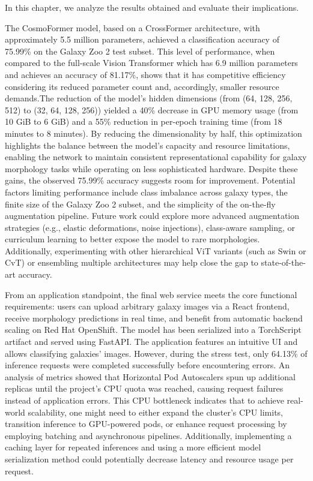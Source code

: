 In this chapter, we analyze the results obtained and evaluate their implications.

The CosmoFormer model, based on a CrossFormer architecture, with approximately 5.5 million parameters, achieved a classification accuracy of 75.99\% on the Galaxy Zoo 2 test subset. This level of performance, when compared to the full-scale Vision Transformer which has 6.9 million parameters and achieves an accuracy of 81.17\%, shows that it has competitive efficiency considering its reduced parameter count and, accordingly, smaller resource demands.The reduction of the model’s hidden dimensions (from (64, 128, 256, 512) to (32, 64, 128, 256)) yielded a 40\% decrease in GPU memory usage (from 10 GiB to 6 GiB) and a 55\% reduction in per-epoch training time (from 18 minutes to 8 minutes). By reducing the dimensionality by half, this optimization highlights the balance between the model’s capacity and resource limitations, enabling the network to maintain consistent representational capability for galaxy morphology tasks while operating on less sophisticated hardware. Despite these gains, the observed 75.99\% accuracy suggests room for improvement. Potential factors limiting performance include class imbalance across galaxy types, the finite size of the Galaxy Zoo 2 subset, and the simplicity of the on-the-fly augmentation pipeline. Future work could explore more advanced augmentation strategies (e.g., elastic deformations, noise injections), class-aware sampling, or curriculum learning to better expose the model to rare morphologies. Additionally, experimenting with other hierarchical ViT variants (such as Swin or CvT) or ensembling multiple architectures may help close the gap to state-of-the-art accuracy.

From an application standpoint, the final web service meets the core functional requirements: users can upload arbitrary galaxy images via a React frontend, receive morphology predictions in real time, and benefit from automatic backend scaling on Red Hat OpenShift. The model has been serialized into a TorchScript artifact and served using FastAPI. The application features an intuitive UI and allows classifying galaxies' images. However, during the stress test, only 64.13\% of inference requests were completed successfully before encountering errors. An analysis of metrics showed that Horizontal Pod Autoscalers spun up additional replicas until the project's CPU quota was reached, causing request failures instead of application errors. This CPU bottleneck indicates that to achieve real-world scalability, one might need to either expand the cluster's CPU limits, transition inference to GPU-powered pods, or enhance request processing by employing batching and asynchronous pipelines. Additionally, implementing a caching layer for repeated inferences and using a more efficient model serialization method could potentially decrease latency and resource usage per request.

